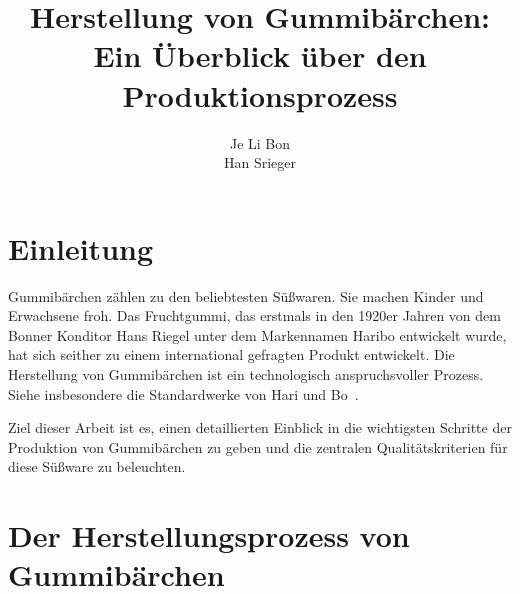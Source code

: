 \documentclass[ngerman]{seminarvorlage}
\begin{document}
\title{Herstellung von Gummibärchen: Ein Überblick über den Produktionsprozess}
\author{
  \alignauthor Je Li Bon \\
  \alignauthor Han Srieger\\
}

\maketitle%
\newpage



\section{Einleitung}

Gummibärchen zählen zu den beliebtesten Süßwaren. Sie machen Kinder und Erwachsene froh. Das Fruchtgummi, das erstmals in den 1920er Jahren von dem Bonner Konditor Hans Riegel unter dem Markennamen Haribo entwickelt wurde, hat sich seither zu einem international gefragten Produkt entwickelt. Die Herstellung von Gummibärchen ist ein technologisch anspruchsvoller Prozess. Siehe insbesondere die Standardwerke von Hari und Bo~\cite{ACM2019,Ivory2001}.

 Ziel dieser Arbeit ist es, einen detaillierten Einblick in die wichtigsten Schritte der Produktion von Gummibärchen zu geben und die zentralen Qualitätskriterien für diese Süßware zu beleuchten.

\section{Der Herstellungsprozess von Gummibärchen}
\end{document}
